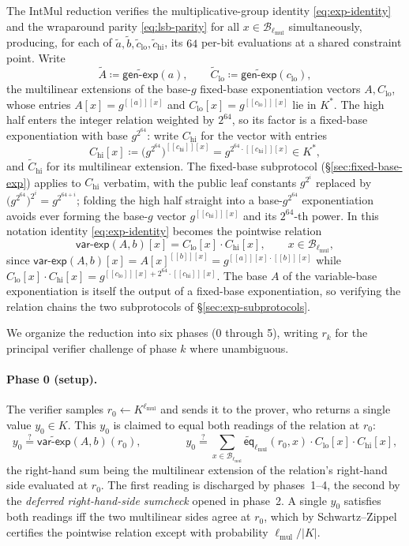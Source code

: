 \documentclass{article}
\theoremstyle{definition}
\newcommand*{\mle}{\widetilde}
\newcommand{\eq}{\mathsf{eq}}
\newcommand{\BB}{\mathcal{B}}
\newcommand{\intval}[1]{[\![#1]\!]}
\begin{document}
The IntMul reduction verifies the multiplicative-group identity \eqref{eq:exp-identity} and the wraparound parity \eqref{eq:lsb-parity} for all $x \in \BB_{\ell_\text{mul}}$ simultaneously, producing, for each of $\mle{a}, \mle{b}, \mle{c}_\text{lo}, \mle{c}_\text{hi}$, its $64$ per-bit evaluations at a shared constraint point. Write
\[
  \mle{A} \coloneqq \mle{\textsf{gen-exp}}(a), \qquad \mle{C}_\text{lo} \coloneqq \mle{\textsf{gen-exp}}(c_\text{lo}),
\]
the multilinear extensions of the base-$g$ fixed-base exponentiation vectors $A, C_\text{lo}$, whose entries $A[x] = g^{\intval{a}[x]}$ and $C_\text{lo}[x] = g^{\intval{c_\text{lo}}[x]}$ lie in $K^*$. The high half enters the integer relation weighted by $2^{64}$, so its factor is a fixed-base exponentiation with base $g^{2^{64}}$: write $C_\text{hi}$ for the vector with entries
\[
  C_\text{hi}[x] \coloneqq \bigl( g^{2^{64}} \bigr)^{\intval{c_\text{hi}}[x]} = g^{2^{64} \cdot \intval{c_\text{hi}}[x]} \in K^*,
\]
and $\mle{C}_\text{hi}$ for its multilinear extension. The fixed-base subprotocol (\S\ref{sec:fixed-base-exp}) applies to $C_\text{hi}$ verbatim, with the public leaf constants $g^{2^i}$ replaced by $\bigl( g^{2^{64}} \bigr)^{2^i} = g^{2^{64 + i}}$; folding the high half straight into a base-$g^{2^{64}}$ exponentiation avoids ever forming the base-$g$ vector $g^{\intval{c_\text{hi}}[x]}$ and its $2^{64}$-th power. In this notation identity \eqref{eq:exp-identity} becomes the pointwise relation
\[
  \textsf{var-exp}(A, b)[x] = C_\text{lo}[x] \cdot C_\text{hi}[x], \qquad x \in \BB_{\ell_\text{mul}},
\]
since $\textsf{var-exp}(A, b)[x] = A[x]^{\intval{b}[x]} = g^{\intval{a}[x] \cdot \intval{b}[x]}$ while $C_\text{lo}[x] \cdot C_\text{hi}[x] = g^{\intval{c_\text{lo}}[x] + 2^{64} \cdot \intval{c_\text{hi}}[x]}$. The base $A$ of the variable-base exponentiation is itself the output of a fixed-base exponentiation, so verifying the relation chains the two subprotocols of \S\ref{sec:exp-subprotocols}.

We organize the reduction into six phases (0 through 5), writing $r_k$ for the principal verifier challenge of phase $k$ where unambiguous.

\paragraph{Phase 0 (setup).}
The verifier samples $r_0 \gets K^{\ell_\text{mul}}$ and sends it to the prover, who returns a single value $y_0 \in K$. This $y_0$ is claimed to equal both readings of the relation at $r_0$:
\[
  y_0 \stackrel{?}{=} \mle{\textsf{var-exp}}(A, b)(r_0), \qquad\qquad y_0 \stackrel{?}{=} \sum_{x \in \BB_{\ell_\text{mul}}} \mle{\eq}_{\ell_\text{mul}}(r_0, x) \cdot C_\text{lo}[x] \cdot C_\text{hi}[x],
\]
the right-hand sum being the multilinear extension of the relation's right-hand side evaluated at $r_0$. The first reading is discharged by phases~1--4, the second by the \emph{deferred right-hand-side sumcheck} opened in phase~2. A single $y_0$ satisfies both readings iff the two multilinear sides agree at $r_0$, which by Schwartz--Zippel certifies the pointwise relation except with probability $\ell_\text{mul} / |K|$.
\end{document}
